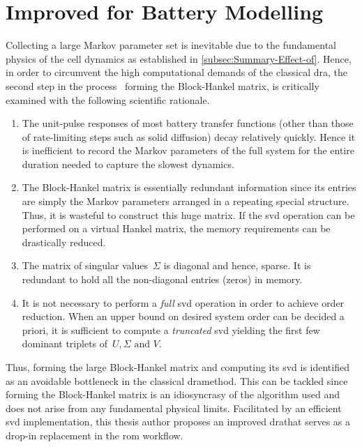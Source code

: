 \section{Improved  for Battery Modelling}\label{sec:Efficient-Computation-of}

Collecting a  large Markov parameter  set is  inevitable due to  the fundamental
physics of the cell  dynamics as established in \cref{subsec:Summary-Effect-of}.
Hence, in  order to circumvent the  high computational demands of  the classical
\gls{dra}, the second step in the process \ie~forming the Block-Hankel matrix,
is critically examined with the following scientific rationale.

\begin{enumerate}
	\item
        The unit-pulse responses of most  battery transfer functions (other than
        those of rate-limiting  steps such as solid  diffusion) decay relatively
        quickly. Hence it is inefficient to  record the Markov parameters of the
        full  system for  the  entire  duration needed  to  capture the  slowest
        dynamics.
	\item
        The Block-Hankel  matrix is essentially redundant  information since its
        entries are simply the Markov parameters arranged in a repeating special
        structure. Thus,  it is wasteful to  construct this huge matrix.  If the
        \gls{svd} operation  can be  performed on a  virtual Hankel  matrix, the
        memory requirements can be drastically reduced.
	\item
        The matrix of singular values~$\Sigma$ is diagonal and hence, sparse. It
        is redundant to hold all the non-diagonal entries (zeros) in memory.
	\item
        It  is not  necessary to  perform a  \emph{full} \gls{svd}  operation in
        order  to  achieve order  reduction.  When  an  upper bound  on  desired
        system order  can be  decided a  priori, it is  sufficient to  compute a
        \emph{truncated}  \gls{svd} yielding  the  first  few dominant  triplets
        of~${U, \Sigma \text{ and } V}$.
\end{enumerate}
Thus,  forming the  large Block-Hankel  matrix  and computing  its \gls{svd}  is
identified as an avoidable bottleneck in the classical \gls{dra}method. This can
be  tackled since  forming the  Block-Hankel matrix  is an  idiosyncrasy of  the
algorithm  used  and  does  not  arise from  any  fundamental  physical  limits.
Facilitated  by  an  efficient  \gls{svd}  implementation,  this  thesis  author
proposes  an improved  \gls{dra}that  serves  as a  drop-in  replacement in  the
\gls{rom} workflow.

